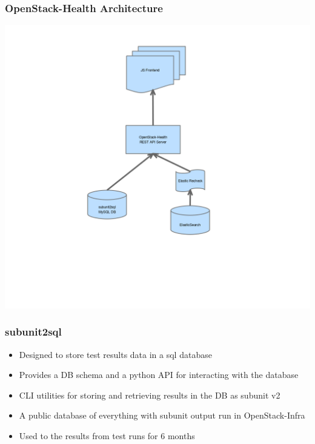 \documentclass[aspectratio=169,11pt,hyperref={colorlinks=true}]{beamer}
\begin{document}
\begin{frame}
    \frametitle{OpenStack-Health Architecture}
    \begin{center}
        \includegraphics[height=1.1\textheight]{openstack-health-arch.png}
    \end{center}
\end{frame}

\begin{frame}
    \frametitle{subunit2sql}
    \begin{itemize}
        \item Designed to store test results data in a sql database
        \item Provides a DB schema and a python API for interacting with the
              database
        \item CLI utilities for storing and retrieving results in the DB as subunit v2
        \item A public database of everything with subunit output run in OpenStack-Infra
        \item Used to the results from test runs for 6 months
    \end{itemize}

\end{frame}
\end{document}
